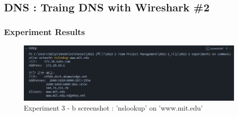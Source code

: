 \subsection{DNS : Traing DNS with Wireshark \#2}
    \subsubsection*{Experiment Results}
        \vspace{-2mm}  
        \begin{figure}[!h]\centering
            \hspace{10mm} 
    		\includegraphics[width=.78\textwidth]{image/result_week01/Q3-8-0.png}
    		\caption{\footnotesize Experiment 3 - b screenshot : 'nslookup' on 'www.mit.edu'}
    		\vspace{-10pt}
        \end{figure}
\clearpage
